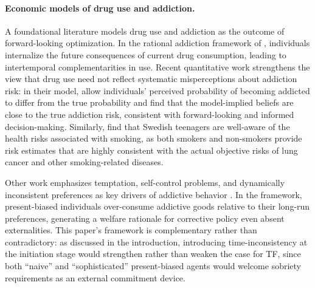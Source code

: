 \documentclass[parskip=full]{article}
\theoremstyle{plain}
\theoremstyle{definition}
\theoremstyle{remark}
\begin{document}
\paragraph{Economic models of drug use and addiction.}
A foundational literature models drug use and addiction as the outcome of forward-looking optimization. In the rational addiction framework of \citet{becker_murphy_1988}, individuals internalize the future consequences of current drug consumption, leading to intertemporal complementarities in use. Recent quantitative work strengthens the view that drug use need not reflect systematic misperceptions about addiction risk: in their model, \citet{greenwood_guner_kopecky_2025_downward_spiral} allow individuals’ perceived probability of becoming addicted to differ from the true probability and find that the model-implied beliefs are close to the true addiction risk, consistent with forward-looking and informed decision-making. Similarly, \citet{lundborg_lindgren_2002} find that Swedish teenagers are well-aware of the health risks associated with smoking, as both smokers and non-smokers provide risk estimates that are highly consistent with the actual objective risks of lung cancer and other smoking-related diseases. 

Other work emphasizes temptation, self-control problems, and dynamically inconsistent preferences as key drivers of addictive behavior \citep{laibson1997golden,gruber_koszegi_2001}. In the \citet{gruber_koszegi_2001} framework, present-biased individuals over-consume addictive goods relative to their long-run preferences, generating a welfare rationale for corrective policy even absent externalities. This paper's framework is complementary rather than contradictory: as discussed in the introduction, introducing time-inconsistency at the initiation stage would strengthen rather than weaken the case for TF, since both ``naive'' and ``sophisticated'' present-biased agents would welcome sobriety requirements as an external commitment device.
\end{document}

